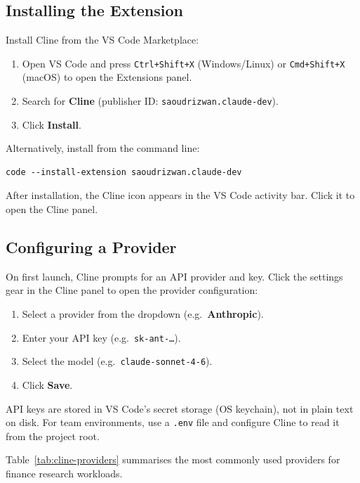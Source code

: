 \subsection{Installing the Extension}
\label{app:cline:vscode-install}

Install Cline from the VS Code Marketplace:

\begin{enumerate}
  \item Open VS Code and press \texttt{Ctrl+Shift+X} (Windows/Linux) or
        \texttt{Cmd+Shift+X} (macOS) to open the Extensions panel.
  \item Search for \textbf{Cline} (publisher ID: \texttt{saoudrizwan.claude-dev}).
  \item Click \textbf{Install}.
\end{enumerate}

Alternatively, install from the command line:

\begin{verbatim}
code --install-extension saoudrizwan.claude-dev
\end{verbatim}

After installation, the Cline icon appears in the VS Code activity bar.
Click it to open the Cline panel.

\subsection{Configuring a Provider}
\label{app:cline:provider}

On first launch, Cline prompts for an API provider and key.  Click the settings
gear in the Cline panel to open the provider configuration:

\begin{enumerate}
  \item Select a provider from the dropdown (e.g.\ \textbf{Anthropic}).
  \item Enter your API key (e.g.\ \texttt{sk-ant-\ldots}).
  \item Select the model (e.g.\ \texttt{claude-sonnet-4-6}).
  \item Click \textbf{Save}.
\end{enumerate}

API keys are stored in VS Code's secret storage (OS keychain), not in plain
text on disk.  For team environments, use a \texttt{.env} file and configure
Cline to read it from the project root.

Table~\ref{tab:cline-providers} summarises the most commonly used providers
for finance research workloads.

